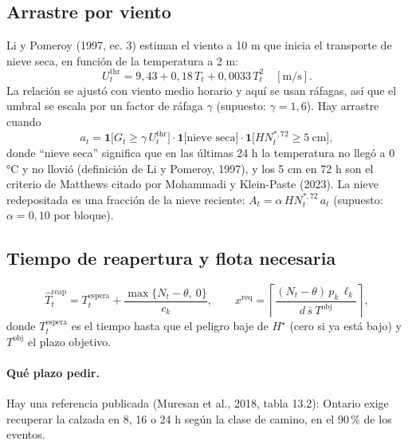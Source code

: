 \subsection{Arrastre por viento}
Li y Pomeroy (1997, ec. 3) estiman el viento a 10 m que inicia el transporte de nieve seca, en función de la temperatura a 2 m:
\begin{equation}
U^{\mathrm{thr}}_t = 9{,}43 + 0{,}18\, T_t + 0{,}0033\, T_t^2 \quad [\text{m/s}].
\end{equation}
La relación se ajustó con viento medio horario y aquí se usan ráfagas, así que el umbral se escala por un factor de ráfaga $\gamma$ (supuesto: $\gamma = 1{,}6$). Hay arrastre cuando
\begin{equation}
a_t = \mathbf{1}\big[G_t \ge \gamma\, U^{\mathrm{thr}}_t\big] \cdot \mathbf{1}\big[\text{nieve seca}\big] \cdot \mathbf{1}\big[HN^{*,72}_t \ge 5\ \text{cm}\big],
\end{equation}
donde ``nieve seca'' significa que en las últimas 24 h la temperatura no llegó a 0\,°C y no llovió (definición de Li y Pomeroy, 1997), y los 5 cm en 72 h son el criterio de Matthews citado por Mohammadi y Klein-Paste (2023). La nieve redepositada es una fracción de la nieve reciente: $A_t = \alpha\, HN^{*,72}_t\, a_t$ (supuesto: $\alpha = 0{,}10$ por bloque).

\subsection{Tiempo de reapertura y flota necesaria}
\begin{equation}
\widehat{T}^{\mathrm{reap}}_t = T^{\mathrm{espera}}_t + \frac{\max\{N_t - \theta,\ 0\}}{c_k},
\qquad
x^{\mathrm{req}} = \left\lceil \frac{(N_t - \theta)\, p_k\, \ell_k}{d\, \bar s\ T^{\mathrm{obj}}} \right\rceil ,
\end{equation}
donde $T^{\mathrm{espera}}_t$ es el tiempo hasta que el peligro baje de $H^\star$ (cero si ya está bajo) y $T^{\mathrm{obj}}$ el plazo objetivo.

\paragraph{Qué plazo pedir.} Hay una referencia publicada (Muresan et al., 2018, tabla 13.2): Ontario exige recuperar la calzada en 8, 16 o 24 h según la clase de camino, en el 90\,\% de los eventos.

